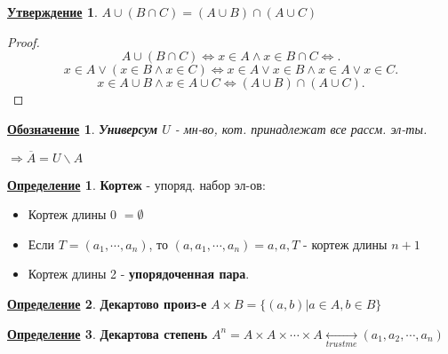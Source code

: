 \documentclass[a4, 12pt]{article}
\newtheorem{statement}{\underline{Утверждение}}[section]
\newtheorem*{symb}{\underline{Обозначение}}
\theoremstyle{definition}
\newtheorem{definition}{\underline{Определение}}[section]
\begin{document}
\begin{statement}
$A \cup (B \cap C) = (A \cup B) \cap (A \cup C)$
\end{statement}
\begin{proof}
\[
A \cup (B \cap C) \iff  x \in A \land x \in B \cap C \iff 
.\] 
\[
x \in A \lor (x \in B \land x \in C) \iff x \in A \lor x \in B \land x \in A \lor x \in C
.\] 
\[
x \in A \cup B \land x \in A \cup C \iff (A \cup B) \cap (A \cup C)
.\] 
\end{proof}

\begin{symb}
\textbf{Универсум} $U$ - мн-во, кот. принадлежат все рассм. эл-ты.
\end{symb}
$\Rightarrow \overline{A} = U \backslash A$

\begin{definition}
    \textbf{Кортеж} - упоряд. набор эл-ов:
    \begin{itemize}
        \item Кортеж длины 0 $ = \emptyset$ 
        \item Если $T = (a_1, \cdots, a_n)$, то $(a, a_1, \cdots, a_n) = {a, {a, T}}$ - кортеж длины $n + 1$ 
        \item Кортеж длины 2 - \textbf{упорядоченная пара}.
    \end{itemize}
\end{definition}

\begin{definition}
    \textbf{Декартово произ-е} $A \times B = \{(a, b) | a \in A, b \in B\}$
\end{definition}
\begin{definition}
    \textbf{Декартова степень} $A^n = A \times A \times \cdots \times A \underset{trust me}{\longleftrightarrow}  (a_1, a_2, \cdots, a_n) $
\end{definition}
\end{document}
